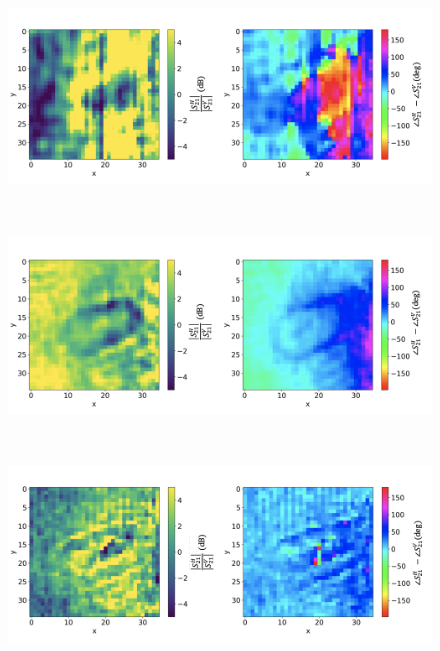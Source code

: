 \documentclass[11pt,a4paper,uplatex]{ujarticle}
\begin{document}
  \begin{figure}[tbp]
    \begin{minipage}[b]{0.995\textwidth}
      \centering
      \includegraphics[keepaspectratio, width=140mm]{Images/python/yokonarabe/diff/processed/50.png}
    \end{minipage}\\
    \begin{minipage}[b]{0.995\textwidth}
      \centering
      \includegraphics[keepaspectratio, width=140mm]{Images/python/yokonarabe/diff/processed/90.png}
    \end{minipage}\\
    \begin{minipage}[b]{0.995\textwidth}
      \centering
      \includegraphics[keepaspectratio, width=140mm]{Images/python/yokonarabe/diff/processed/130.png}

\end{minipage}
\end{figure}
\end{document}
